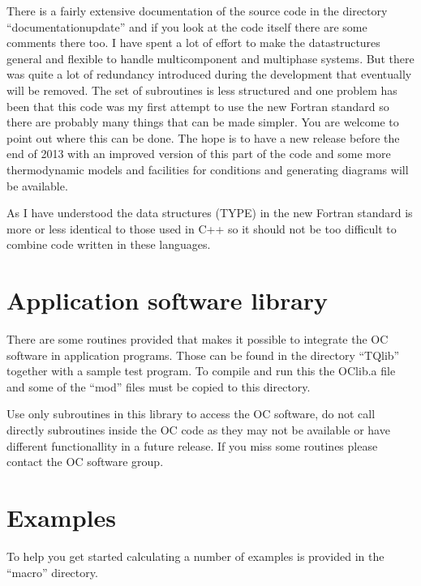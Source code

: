 \documentclass[12pt]{article}
\begin{document}
There is a fairly extensive documentation of the source code in the
directory ``documentationupdate'' and if you look at the code itself
there are some comments there too.  I have spent a lot of effort to
make the datastructures general and flexible to handle multicomponent
and multiphase systems.  But there was quite a lot of redundancy
introduced during the development that eventually will be removed.
The set of subroutines is less structured and one problem has been
that this code was my first attempt to use the new Fortran standard so
there are probably many things that can be made simpler.  You are
welcome to point out where this can be done.  The hope is to have a
new release before the end of 2013 with an improved version of this
part of the code and some more thermodynamic models and facilities for
conditions and generating diagrams will be available.

As I have understood the data structures (TYPE) in the new Fortran
standard is more or less identical to those used in C++ so it should
not be too difficult to combine code written in these languages.

\section{Application software library}

There are some routines provided that makes it possible to integrate
the OC software in application programs.  Those can be found in the
directory ``TQlib'' together with a sample test program.  To compile
and run this the OClib.a file and some of the ``mod'' files must be
copied to this directory.

Use only subroutines in this library to access the OC software, do not
call directly subroutines inside the OC code as they may not be
available or have different functionallity in a future release.  If
you miss some routines please contact the OC software group.

\section{Examples}

To help you get started calculating a number of examples is
provided in the ``macro'' directory.
\end{document}
